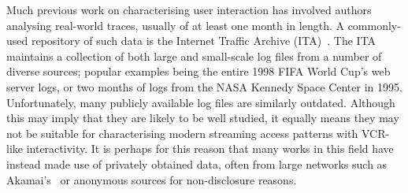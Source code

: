 \documentclass[a4paper,11pt]{article}
\begin{document}
%
Much previous work on characterising user interaction has involved authors analysing real-world traces, usually of at least one month in length. A commonly-used repository of such data is the Internet Traffic Archive (ITA)~\cite{ITA}. The ITA maintains a collection of both large and small-scale log files from a number of diverse sources; popular examples being the entire 1998 FIFA World Cup's web server logs, or two months of logs from the NASA Kennedy Space Center in 1995. Unfortunately, many publicly available log files are similarly outdated. Although this may imply that they are likely to be well studied, it equally means they may not be suitable for characterising modern streaming access patterns with VCR-like interactivity. It is perhaps for this reason that many works in this field have instead made use of privately obtained data, often from large networks such as Akamai's~\cite{akamai} or anonymous sources for non-disclosure reasons.
\end{document}
